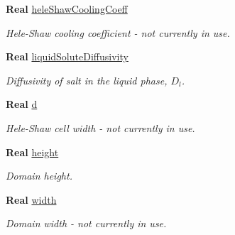 \begin{DoxyCompactItemize}
\mbox{\label{class_mushy_layer_params_aad3b65b68693c8e28778eed4738cfeb7}} 
\textbf{ Real} \hyperlink{class_mushy_layer_params_aad3b65b68693c8e28778eed4738cfeb7}{hele\+Shaw\+Cooling\+Coeff}
\begin{DoxyCompactList}\small\item\em Hele-\/\+Shaw cooling coefficient -\/ not currently in use. \end{DoxyCompactList}\item 
\mbox{\label{class_mushy_layer_params_aeb3d05c0fc784e2fbe216e2ca086d5e1}} 
\textbf{ Real} \hyperlink{class_mushy_layer_params_aeb3d05c0fc784e2fbe216e2ca086d5e1}{liquid\+Solute\+Diffusivity}
\begin{DoxyCompactList}\small\item\em Diffusivity of salt in the liquid phase, $ D_l $. \end{DoxyCompactList}\item 
\mbox{\label{class_mushy_layer_params_a5016899efd8d969b2f65c20a3239fbe7}} 
\textbf{ Real} \hyperlink{class_mushy_layer_params_a5016899efd8d969b2f65c20a3239fbe7}{d}
\begin{DoxyCompactList}\small\item\em Hele-\/\+Shaw cell width -\/ not currently in use. \end{DoxyCompactList}\item 
\mbox{\label{class_mushy_layer_params_ae6c806a4560f2711543ba1a9b72e7d76}} 
\textbf{ Real} \hyperlink{class_mushy_layer_params_ae6c806a4560f2711543ba1a9b72e7d76}{height}
\begin{DoxyCompactList}\small\item\em Domain height. \end{DoxyCompactList}\item 
\mbox{\label{class_mushy_layer_params_a90af7620cab61b798af5843f8b003386}} 
\textbf{ Real} \hyperlink{class_mushy_layer_params_a90af7620cab61b798af5843f8b003386}{width}
\begin{DoxyCompactList}\small\item\em Domain width -\/ not currently in use. \end{DoxyCompactList}\item 
\mbox{\label{class_mushy_layer_params_a8124873b3f9a1a5657b1b980b99d6b3b}} 

\end{DoxyCompactItemize}
